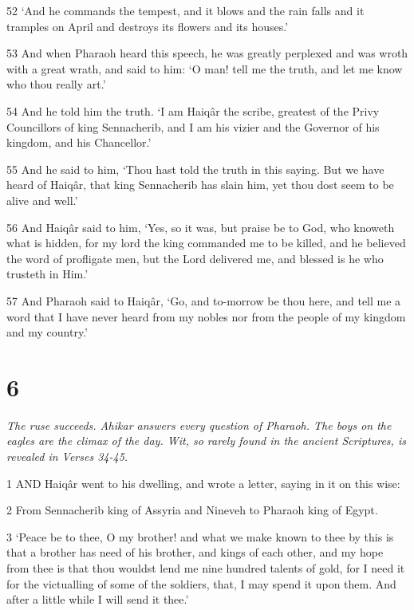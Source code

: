 \par 52 ‘And he commands the tempest, and it blows and the rain falls and it tramples on April and destroys its flowers and its houses.’

\par 53 And when Pharaoh heard this speech, he was greatly perplexed and was wroth with a great wrath, and said to him: ‘O man! tell me the truth, and let me know who thou really art.’

\par 54 And he told him the truth. ‘I am Haiqâr the scribe, greatest of the Privy Councillors of king Sennacherib, and I am his vizier and the Governor of his kingdom, and his Chancellor.’

\par 55 And he said to him, ‘Thou hast told the truth in this saying. But we have heard of Haiqâr, that king Sennacherib has slain him, yet thou dost seem to be alive and well.’

\par 56 And Haiqâr said to him, ‘Yes, so it was, but praise be to God, who knoweth what is hidden, for my lord the king commanded me to be killed, and he believed the word of profligate men, but the Lord delivered me, and blessed is he who trusteth in Him.’

\par 57 And Pharaoh said to Haiqâr, ‘Go, and to-morrow be thou here, and tell me a word that I have never heard from my nobles nor from the people of my kingdom and my country.’

\chapter{6}

\par \textit{The ruse succeeds. Ahikar answers every question of Pharaoh. The boys on the eagles are the climax of the day. Wit, so rarely found in the ancient Scriptures, is revealed in Verses 34-45.}

\par 1 AND Haiqâr went to his dwelling, and wrote a letter, saying in it on this wise:

\par 2 From Sennacherib king of Assyria and Nineveh to Pharaoh king of Egypt.

\par 3 ‘Peace be to thee, O my brother! and what we make known to thee by this is that a brother has need of his brother, and kings of each other, and my hope from thee is that thou wouldst lend me nine hundred talents of gold, for I need it for the victualling of some of the soldiers, that, I may spend it upon them. And after a little while I will send it thee.’

